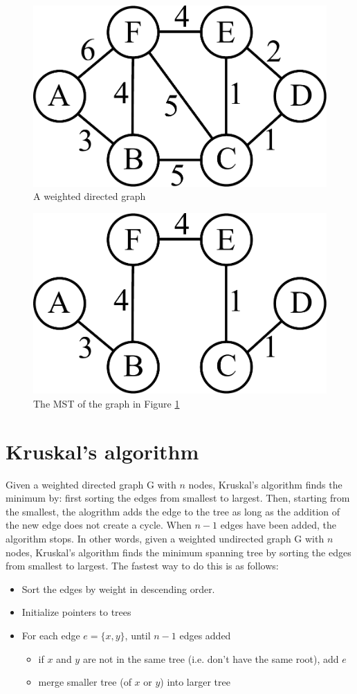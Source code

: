 \begin{figure}[H]
\includegraphics[width = .4\textwidth]{graph4.pdf}
\caption{A weighted directed graph}
\label{mst:graph4}
\end{figure}

\begin{figure}[H]
\includegraphics[width = .4\textwidth]{graph5.pdf}
\caption{The MST of the graph in Figure \ref{mst:graph4}}
\end{figure}

\section*{Kruskal's algorithm}

Given a weighted directed graph G with $n$ nodes, Kruskal's algorithm finds the minimum by: first sorting the edges from smallest to largest.
Then, starting from the smallest, the alogrithm adds the edge to the tree as long as the addition of the new edge does not create a cycle.
When $n-1$ edges have been added, the algorithm stops.
In other words, given a weighted undirected graph G with $n$ nodes, Kruskal's algorithm finds the minimum spanning tree by sorting the edges from smallest to largest.
The fastest way to do this is as follows:

\flushleft

\begin{itemize}


\item Sort the edges by weight in descending order.

\item Initialize pointers to trees

\item For each edge $e=\{x, y\}$, until $n-1$ edges added  

\begin{itemize}

\item if $x$ and $y$ are not in the same tree (i.e. don’t have the same root), add $e$

\item merge smaller tree (of $x$ or $y$) into larger tree 

\end{itemize}

\end{itemize}

